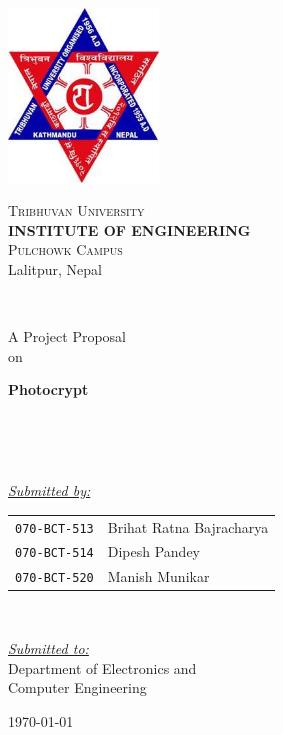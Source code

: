 \begin{titlepage}
    \linespread{1}
    \centering
    \includegraphics[width=0.3\textwidth]{images/tu-logo.png}

    \LARGE
    \textsc{Tribhuvan University}\\
    \Large
    \textbf{INSTITUTE OF ENGINEERING}\\
    \Large
    \textsc{Pulchowk Campus} \\
    \large
    Lalitpur, Nepal

    ~

    {\Large A Project Proposal\\on}

    {\Huge \bf Photocrypt}

    ~ 

    ~

    \textit{\uline{Submitted by:}} \\[5pt]
    \begin{tabular}{rl}
        {\small \tt 070-BCT-513} & Brihat Ratna Bajracharya\\
        {\small \tt 070-BCT-514} & Dipesh Pandey\\
        {\small \tt 070-BCT-520} & Manish Munikar\\
    \end{tabular}

    ~

    \textit{\uline{Submitted to:}} \\[5pt]
    Department of Electronics and\\Computer Engineering

    \vfill
    \today
\end{titlepage}
